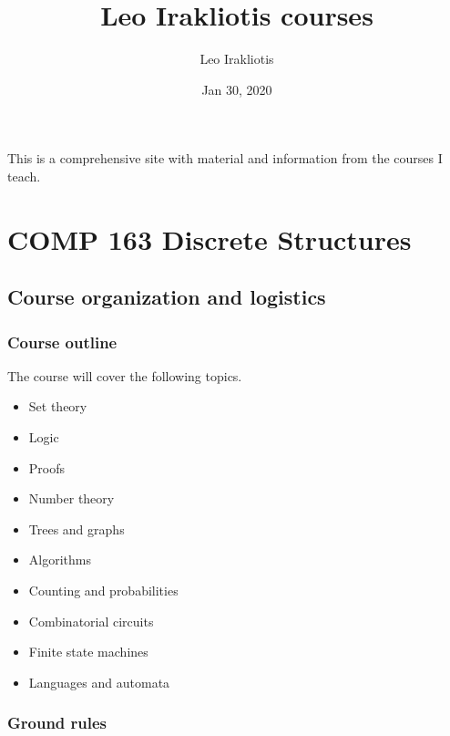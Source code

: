 \documentclass[letterpaper,10pt,english]{sphinxmanual}
\title{Leo Irakliotis\textquotesingle{} courses}
\date{Jan 30, 2020}
\author{Leo Irakliotis}
\begin{document}
\pagestyle{empty}
\sphinxmaketitle
\pagestyle{plain}
\sphinxtableofcontents
\pagestyle{normal}
\label{\detokenize{index::doc}}


This is a comprehensive site with material and information from the courses I teach.


\chapter{COMP 163 Discrete Structures}
\label{\detokenize{COMP163/introduction:comp-163-discrete-structures}}\label{\detokenize{COMP163/introduction::doc}}

\section{Course organization and logistics}
\label{\detokenize{COMP163/organization:course-organization-and-logistics}}\label{\detokenize{COMP163/organization::doc}}

\subsection{Course outline}
\label{\detokenize{COMP163/organization:course-outline}}
The course will cover the following topics.
\begin{itemize}
\item {} 
Set theory

\item {} 
Logic

\item {} 
Proofs

\item {} 
Number theory

\item {} 
Trees and graphs

\item {} 
Algorithms

\item {} 
Counting and probabilities

\item {} 
Combinatorial circuits

\item {} 
Finite state machines

\item {} 
Languages and automata

\end{itemize}


\subsection{Ground rules}
\label{\detokenize{COMP163/organization:ground-rules}}
\end{document}
